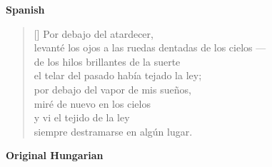 \documentclass[a4paper,12pt,twoside,final]{book}
\begin{document}
\bigskip

\noindent \textbf{Spanish}


\settowidth{\versewidth}{levanté los ojos a las ruedas dentadas de los cielos ---}

\begin{verse}[\versewidth]
  Por debajo del atardecer, \\
  levanté los ojos a las ruedas dentadas de los cielos --- \\
  de los hilos brillantes de la suerte \\
  el telar del pasado había tejado la ley; \\
  por debajo del vapor de mis sueños, \\
  miré de nuevo en los cielos \\
  y vi el tejido de la ley \\
  siempre destramarse en algún lugar. \\
\end{verse}

\newpage


\noindent \textbf{Original Hungarian}



\settowidth{\versewidth}{törvényt szőtt a mult szövőszéke}
\end{document}
